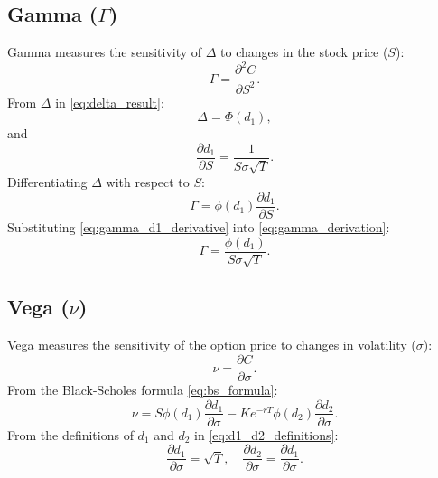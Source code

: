     \subsection{Gamma ($\Gamma$)}
        Gamma measures the sensitivity of $\Delta$ to changes in the stock price ($S$):
        \begin{equation}
            \Gamma = \frac{\partial^2 C}{\partial S^2}.
            \label{eq:gamma_definition}
        \end{equation}
        From $\Delta$ in \eqref{eq:delta_result}:
        \begin{equation}
            \Delta = \Phi(d_1),
            \label{eq:gamma_delta}
        \end{equation}
        and
        \begin{equation}
            \frac{\partial d_1}{\partial S} = \frac{1}{S \sigma \sqrt{T}}.
            \label{eq:gamma_d1_derivative}
        \end{equation}
        Differentiating $\Delta$ with respect to $S$:
        \begin{equation}
            \Gamma = \phi(d_1) \frac{\partial d_1}{\partial S}.
            \label{eq:gamma_derivation}
        \end{equation}
        Substituting \eqref{eq:gamma_d1_derivative} into \eqref{eq:gamma_derivation}:
        \begin{equation}
            \Gamma = \frac{\phi(d_1)}{S \sigma \sqrt{T}}.
            \label{eq:gamma_result}
        \end{equation}

    \subsection{Vega ($\nu$)}
        Vega measures the sensitivity of the option price to changes in volatility ($\sigma$):
        \begin{equation}
            \nu = \frac{\partial C}{\partial \sigma}.
            \label{eq:vega_definition}
        \end{equation}
        From the Black-Scholes formula \eqref{eq:bs_formula}:
        \begin{equation}
            \nu = S \phi(d_1) \frac{\partial d_1}{\partial \sigma}
                - K e^{-rT} \phi(d_2) \frac{\partial d_2}{\partial \sigma}.
            \label{eq:vega_derivation}
        \end{equation}
        From the definitions of $d_1$ and $d_2$ in \eqref{eq:d1_d2_definitions}:
        \begin{equation}
            \frac{\partial d_1}{\partial \sigma}
            = \sqrt{T}, \quad \frac{\partial d_2}{\partial \sigma}
            = \frac{\partial d_1}{\partial \sigma}.
            \label{eq:vega_d1_d2_derivatives}
        \end{equation}

